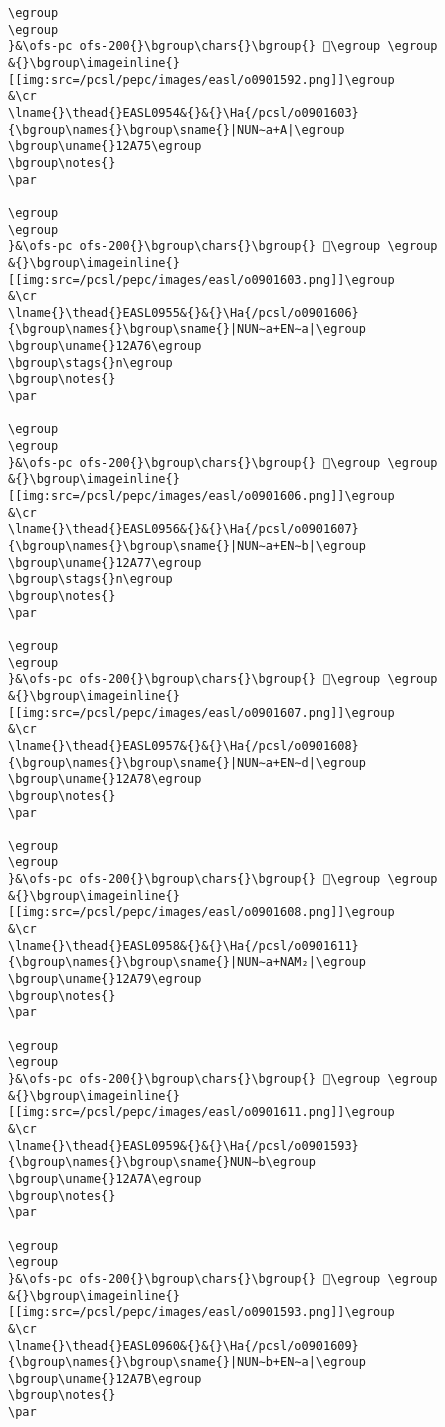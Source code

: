 \begin{verbatim}
\egroup
\egroup
}&\ofs-pc ofs-200{}\bgroup\chars{}\bgroup{} 𒩴\egroup \egroup
&{}\bgroup\imageinline{}[[img:src=/pcsl/pepc/images/easl/o0901592.png]]\egroup
&\cr
\lname{}\thead{}EASL0954&{}&{}\Ha{/pcsl/o0901603}{\bgroup\names{}\bgroup\sname{}|NUN∼a+A|\egroup
\bgroup\uname{}12A75\egroup
\bgroup\notes{}
\par 

\egroup
\egroup
}&\ofs-pc ofs-200{}\bgroup\chars{}\bgroup{} 𒩵\egroup \egroup
&{}\bgroup\imageinline{}[[img:src=/pcsl/pepc/images/easl/o0901603.png]]\egroup
&\cr
\lname{}\thead{}EASL0955&{}&{}\Ha{/pcsl/o0901606}{\bgroup\names{}\bgroup\sname{}|NUN∼a+EN∼a|\egroup
\bgroup\uname{}12A76\egroup
\bgroup\stags{}n\egroup
\bgroup\notes{}
\par 

\egroup
\egroup
}&\ofs-pc ofs-200{}\bgroup\chars{}\bgroup{} 𒩶\egroup \egroup
&{}\bgroup\imageinline{}[[img:src=/pcsl/pepc/images/easl/o0901606.png]]\egroup
&\cr
\lname{}\thead{}EASL0956&{}&{}\Ha{/pcsl/o0901607}{\bgroup\names{}\bgroup\sname{}|NUN∼a+EN∼b|\egroup
\bgroup\uname{}12A77\egroup
\bgroup\stags{}n\egroup
\bgroup\notes{}
\par 

\egroup
\egroup
}&\ofs-pc ofs-200{}\bgroup\chars{}\bgroup{} 𒩷\egroup \egroup
&{}\bgroup\imageinline{}[[img:src=/pcsl/pepc/images/easl/o0901607.png]]\egroup
&\cr
\lname{}\thead{}EASL0957&{}&{}\Ha{/pcsl/o0901608}{\bgroup\names{}\bgroup\sname{}|NUN∼a+EN∼d|\egroup
\bgroup\uname{}12A78\egroup
\bgroup\notes{}
\par 

\egroup
\egroup
}&\ofs-pc ofs-200{}\bgroup\chars{}\bgroup{} 𒩸\egroup \egroup
&{}\bgroup\imageinline{}[[img:src=/pcsl/pepc/images/easl/o0901608.png]]\egroup
&\cr
\lname{}\thead{}EASL0958&{}&{}\Ha{/pcsl/o0901611}{\bgroup\names{}\bgroup\sname{}|NUN∼a+NAM₂|\egroup
\bgroup\uname{}12A79\egroup
\bgroup\notes{}
\par 

\egroup
\egroup
}&\ofs-pc ofs-200{}\bgroup\chars{}\bgroup{} 𒩹\egroup \egroup
&{}\bgroup\imageinline{}[[img:src=/pcsl/pepc/images/easl/o0901611.png]]\egroup
&\cr
\lname{}\thead{}EASL0959&{}&{}\Ha{/pcsl/o0901593}{\bgroup\names{}\bgroup\sname{}NUN∼b\egroup
\bgroup\uname{}12A7A\egroup
\bgroup\notes{}
\par 

\egroup
\egroup
}&\ofs-pc ofs-200{}\bgroup\chars{}\bgroup{} 𒩺\egroup \egroup
&{}\bgroup\imageinline{}[[img:src=/pcsl/pepc/images/easl/o0901593.png]]\egroup
&\cr
\lname{}\thead{}EASL0960&{}&{}\Ha{/pcsl/o0901609}{\bgroup\names{}\bgroup\sname{}|NUN∼b+EN∼a|\egroup
\bgroup\uname{}12A7B\egroup
\bgroup\notes{}
\par 


\end{verbatim}
